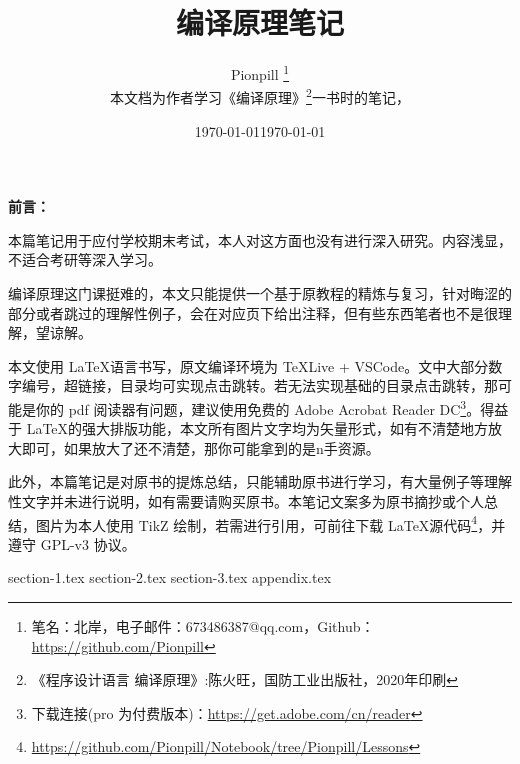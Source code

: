 \documentclass{PionpillNote-art}
\title{编译原理笔记}
\author{
    Pionpill \footnote{笔名：北岸，电子邮件：673486387@qq.com，Github：\url{https://github.com/Pionpill}} \\
    本文档为作者学习《编译原理》\footnote{《程序设计语言 编译原理》:陈火旺，国防工业出版社，2020年印刷}一书时的笔记，\\
}
\date{\today}
\begin{document}
\maketitle

\noindent\textbf{前言：}

本篇笔记用于应付学校期末考试，本人对这方面也没有进行深入研究。内容浅显，不适合考研等深入学习。

编译原理这门课挺难的，本文只能提供一个基于原教程的精炼与复习，针对晦涩的部分或者跳过的理解性例子，会在对应页下给出注释，但有些东西笔者也不是很理解，望谅解。

本文使用 \LaTeX 语言书写，原文编译环境为 TeXLive + VSCode。文中大部分数字编号，超链接，目录均可实现点击跳转。若无法实现基础的目录点击跳转，那可能是你的 pdf 阅读器有问题，建议使用免费的 Adobe Acrobat Reader DC\footnote{下载连接(pro 为付费版本)：\url{https://get.adobe.com/cn/reader}}。得益于 \LaTeX 的强大排版功能，本文所有图片文字均为矢量形式，如有不清楚地方放大即可，如果放大了还不清楚，那你可能拿到的是n手资源。

此外，本篇笔记是对原书的提炼总结，只能辅助原书进行学习，有大量例子等理解性文字并未进行说明，如有需要请购买原书。本笔记文案多为原书摘抄或个人总结，图片为本人使用 TikZ 绘制，若需进行引用，可前往下载 \LaTeX 源代码\footnote{\url{https://github.com/Pionpill/Notebook/tree/Pionpill/Lessons}}，并遵守 GPL-v3 协议。

\date{\today}

\tableofcontents
\thispagestyle{empty}
\newpage
\setcounter{page}{1} 

{section-1.tex}
{section-2.tex}
{section-3.tex}
{appendix.tex}
\end{document}
